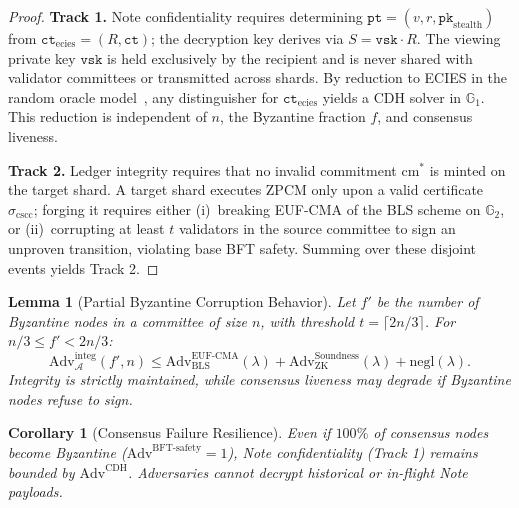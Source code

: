 \documentclass[sigconf,nonacm]{acmart}
\newtheorem{lemma}{Lemma}
\newtheorem{corollary}{Corollary}
\begin{document}
\begin{proof}
\textbf{Track 1.} Note confidentiality requires determining $\mathtt{pt} = (v, r, \mathtt{pk}_{\text{stealth}})$ from $\mathtt{ct}_{\text{ecies}} = (R, \mathtt{ct})$; the decryption key derives via $S = \mathtt{vsk} \cdot R$. The viewing private key $\mathtt{vsk}$ is held exclusively by the recipient and is never shared with validator committees or transmitted across shards. By reduction to ECIES in the random oracle model~\cite{abdalla2001requisite}, any distinguisher for $\mathtt{ct}_{\text{ecies}}$ yields a CDH solver in $\mathbb{G}_1$. This reduction is independent of $n$, the Byzantine fraction $f$, and consensus liveness.

\textbf{Track 2.} Ledger integrity requires that no invalid commitment $\text{cm}^*$ is minted on the target shard. A target shard executes ZPCM only upon a valid certificate $\sigma_{\text{cscc}}$; forging it requires either (i)~breaking EUF-CMA of the BLS scheme on $\mathbb{G}_2$, or (ii)~corrupting at least $t$ validators in the source committee to sign an unproven transition, violating base BFT safety. Summing over these disjoint events yields Track 2.
\end{proof}

\begin{lemma}[Partial Byzantine Corruption Behavior]\label{lem:partial_bft}
Let $f'$ be the number of Byzantine nodes in a committee of size $n$, with threshold $t = \lceil 2n/3 \rceil$. For $n/3 \le f' < 2n/3$:
\begin{equation}
\text{Adv}^{\text{integ}}_{\mathcal{A}}(f', n) \le \text{Adv}^{\text{EUF-CMA}}_{\text{BLS}}(\lambda) + \text{Adv}^{\text{Soundness}}_{\text{ZK}}(\lambda) + \text{negl}(\lambda).
\end{equation}
Integrity is strictly maintained, while consensus liveness may degrade if Byzantine nodes refuse to sign.
\end{lemma}

\begin{corollary}[Consensus Failure Resilience]
Even if $100\%$ of consensus nodes become Byzantine ($\text{Adv}^{\text{BFT-safety}} = 1$), Note confidentiality (Track 1) remains bounded by $\text{Adv}^{\text{CDH}}$. Adversaries cannot decrypt historical or in-flight Note payloads.
\end{corollary}
\end{document}

